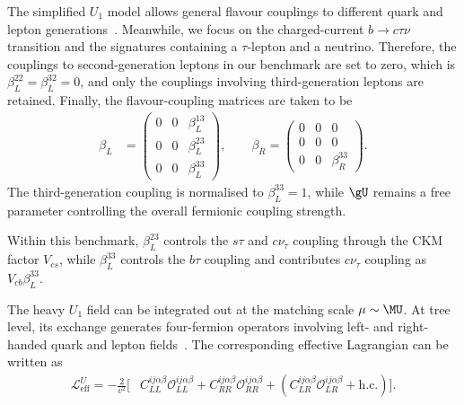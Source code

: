 The simplified $U_{1}$ model allows general flavour couplings to different quark and lepton generations~\cite{Cornella2019}. Meanwhile, we focus on the charged-current $b\rightarrow c\tau\nu$ transition and the signatures containing a $\tau$-lepton and a neutrino. Therefore, the couplings to second-generation leptons in our benchmark are set to zero, which is $\beta_{L}^{22}=\beta_{L}^{32}=0$, and only the couplings involving third-generation leptons are retained. Finally, the flavour-coupling matrices are taken to be
\begin{equation}
    \begin{aligned}
        \beta_{L} &=
        \begin{pmatrix}
            0 & 0 & \beta_{L}^{13} \\
            0 & 0 & \beta_{L}^{23} \\
            0 & 0 & \beta_{L}^{33}
        \end{pmatrix},
        \qquad
        \beta_{R} =
        \begin{pmatrix}
            0 & 0 & 0 \\
            0 & 0 & 0 \\
            0 & 0 & \beta_{R}^{33}
        \end{pmatrix}.
    \end{aligned}
    \label{eq:u1_beta_texture}
\end{equation}
The third-generation coupling is normalised to $\beta_{L}^{33}=1$, while $\gU$ remains a free parameter controlling the overall fermionic coupling strength.

Within this benchmark, $\beta_{L}^{23}$ controls the $s\tau$ and $c\nu_\tau$ coupling through the CKM factor $V_{cs}$, while $\beta_L^{33}$ controls the $b\tau$ coupling and contributes $c\nu_\tau$ coupling as $V_{cb}\beta_L^{33}$.


The heavy $U_{1}$ field can be integrated out at the matching scale $\mu\sim \MU$.
At tree level, its exchange generates four-fermion operators involving left- and right-handed quark and lepton fields~\cite{Aebischer2022}. The corresponding effective Lagrangian can be written as
\begin{align}
\mathcal{L}_{\mathrm{eff}}^{U}
=
-\frac{2}{v^{2}}
\bigg[
& C_{LL}^{ij\alpha\beta}
\mathcal{O}_{LL}^{ij\alpha\beta}
+
C_{RR}^{ij\alpha\beta}
\mathcal{O}_{RR}^{ij\alpha\beta}
+
\left(
C_{LR}^{ij\alpha\beta}
\mathcal{O}_{LR}^{ij\alpha\beta}
+
\mathrm{h.c.}
\right)
\bigg].
\label{eq:u1_low_energy_effective_lagrangian}
\end{align}

